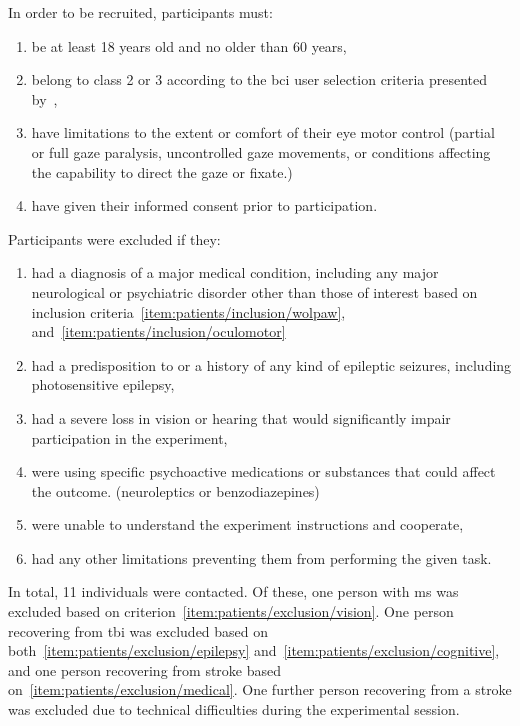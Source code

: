 \documentclass[twocolumn]{article}
\begin{document}
In order to be recruited, participants must:
\begin{enumerate}
	\item be at least 18 years old and no older than 60
	      years,
	\item belong to class 2 or 3 according to the \ac{bci}	user selection criteria
	      presented by~\textcite{Wolpaw2006},
	      \label{item:patients/inclusion/wolpaw}
	\item have limitations to the extent or comfort of their eye motor control
	      (partial or full gaze paralysis, uncontrolled gaze movements, or conditions affecting the capability to direct the gaze or fixate.)
	      \label{item:patients/inclusion/oculomotor}
	\item have given their informed consent prior to participation.
\end{enumerate}
Participants were excluded if they:
\begin{enumerate}
	\item had a diagnosis of a major medical condition, including any major
	      neurological or psychiatric disorder other than those of interest based on
	      inclusion criteria~\ref{item:patients/inclusion/wolpaw},
	      and~\ref{item:patients/inclusion/oculomotor}\label{item:patients/exclusion/medical}
	\item had a predisposition to or a history of any kind of epileptic seizures,
	      including photosensitive epilepsy,\label{item:patients/exclusion/epilepsy}
	\item had a severe loss in vision or hearing that would significantly impair
	      participation in the experiment,\label{item:patients/exclusion/vision}
	\item were using specific psychoactive medications or substances that could affect the outcome.
	      (neuroleptics or benzodiazepines)
	      \label{item:patients/exclusion/cognitive}
	\item were unable to understand the experiment instructions and cooperate,
	\item had any other limitations preventing them from performing the given task.
\end{enumerate}

In total, 11 individuals were contacted. Of these, one person with
\ac{ms} was excluded based on criterion~\ref{item:patients/exclusion/vision}.
One person recovering from \ac{tbi} was excluded based on both~\ref{item:patients/exclusion/epilepsy}
and~\ref{item:patients/exclusion/cognitive}, and one person recovering from
stroke based on~\ref{item:patients/exclusion/medical}.
One further person recovering from a stroke was excluded due to technical
difficulties during the experimental session.
\end{document}
